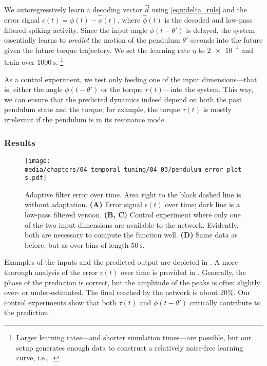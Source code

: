 We autoregressively learn a decoding vector $\vec d$ using \cref{eqn:delta_rule} and the error signal $\epsilon(t) = \phi(t) - \hat \phi(t)$, where $\hat \phi(t)$ is the decoded and low-pass filtered spiking activity.
Since the input angle $\phi(t - \theta')$ is delayed, the system essentially learns to \emph{predict} the motion of the pendulum $\theta'$ seconds into the future given the future torque trajectory.
We set the learning rate $\eta$ to $\num{2e-4}$ and train over $\SI{1000}{\second}$.%
\footnote{Larger learning rates---and shorter simulation times---are possible, but our setup generates enough data to construct a relatively noise-free learning curve, i.e., .}

As a control experiment, we test only feeding one of the input dimensions---that is, either the angle $\phi(t - \theta')$ or the torque $\tau(t)$---into the system.
This way, we can ensure that the predicted dynamics indeed depend on both the past pendulum state and the torque; for example, the torque $\tau(t)$ is mostly irrelevant if the pendulum is in its resonance mode.

\subsubsection{Results}

\begin{figure}
	\centering
	\texttt{[image: media/chapters/04\_temporal\_tuning/04\_03/pendulum\_error\_plots.pdf]}
	\caption[Adaptive filter error over time]{
		Adaptive filter error over time.
		Area right to the black dashed line is without adaptation.
		\textbf{(A)} Error signal $\epsilon(t)$ over time; dark line is a low-pass filtered version.
		\textbf{(B, C)} Control experiment where only one of the two input dimensions are available to the network.
		Evidently, both are necessary to compute the function well.
		\textbf{(D)} Same data as before, but as \NRMSE over bins of length $\SI{50}{\second}$.
	}
	\label{fig:pendulum_error_plots}
\end{figure}

Examples of the inputs and the predicted output are depicted in .
A more thorough analysis of the error $\epsilon(t)$ over time is provided in .
Generally, the phase of the prediction is correct, but the amplitude of the peaks is often slightly over- or under-estimated.
The final \NRMSE reached by the network is about $20\%$.
Our control experiments show that both $\tau(t)$ and $\phi(t - \theta')$ critically contribute to the prediction.

